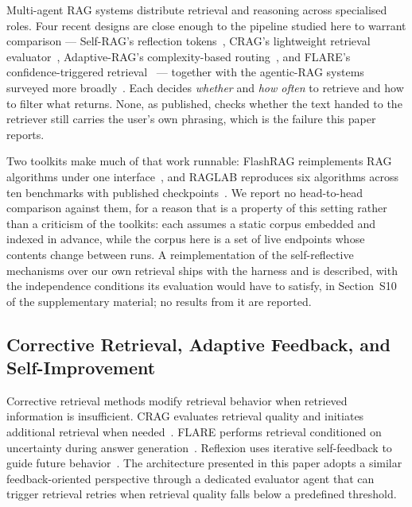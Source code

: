 \documentclass[acmsmall,review,anonymous,screen]{acmart}
\begin{document}
Multi-agent RAG systems distribute retrieval and reasoning across specialised
roles. Four recent designs are close enough to the pipeline studied here to
warrant comparison --- Self-RAG's reflection tokens~\cite{asai2024selfrag},
CRAG's lightweight retrieval evaluator~\cite{yan2024crag}, Adaptive-RAG's
complexity-based routing~\cite{jeong2024adaptiverag}, and FLARE's
confidence-triggered retrieval~\cite{jiang2023flare} --- together with the
agentic-RAG systems surveyed more
broadly~\cite{mishra2026sok,shaikh2026dissecting,besrour2025ragenta,qin2025amber}.
Each decides \emph{whether} and \emph{how often} to retrieve and how to filter
what returns. None, as published, checks whether the text handed to the
retriever still carries the user's own phrasing, which is the failure this
paper reports.

Two toolkits make much of that work runnable: FlashRAG reimplements RAG
algorithms under one
interface~\cite{jin2025flashrag,flashrag2025repo}, and RAGLAB reproduces six
algorithms across ten benchmarks with published
checkpoints~\cite{zhang2024raglab,raglab2024repo}. We report no head-to-head
comparison against them, for a reason that is a property of this setting rather
than a criticism of the toolkits: each assumes a static corpus embedded and
indexed in advance, while the corpus here is a set of live endpoints whose
contents change between runs. A reimplementation of the self-reflective
mechanisms over our own retrieval ships with the harness and is described, with
the independence conditions its evaluation would have to satisfy, in
Section~S10 of the supplementary material; no results from it are reported.

\subsection{Corrective Retrieval, Adaptive Feedback, and Self-Improvement}

Corrective retrieval methods modify retrieval behavior when retrieved
information is insufficient. CRAG evaluates retrieval quality and
initiates additional retrieval when needed~\cite{yan2024crag}. FLARE
performs retrieval conditioned on uncertainty during answer
generation~\cite{jiang2023flare}. Reflexion uses iterative self-feedback
to guide future behavior~\cite{shinn2023reflexion}. The architecture
presented in this paper adopts a similar feedback-oriented perspective
through a dedicated evaluator agent that can trigger retrieval retries
when retrieval quality falls below a predefined threshold.
\end{document}
